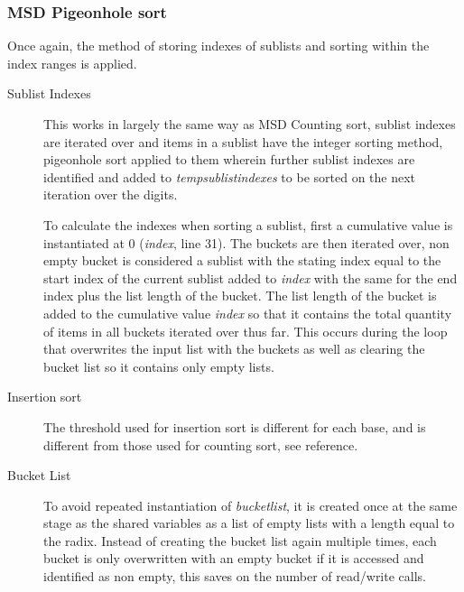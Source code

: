 \documentclass[12pt]{article}
\begin{document}
\subsubsection{MSD Pigeonhole sort}
Once again, the method of storing indexes of sublists and sorting within the index ranges is applied.
\begin{description}
	\item[Sublist Indexes] This works in largely the same way as MSD Counting sort, sublist indexes are iterated over and items in a sublist have the integer sorting method, pigeonhole sort applied to them wherein further sublist indexes are identified and added to \textit{temp\textunderscore sublist\textunderscore indexes} to be sorted on the next iteration over the digits.
	\par To calculate the indexes when sorting a sublist, first a cumulative value is instantiated at 0 (\textit{index}, line 31). The buckets are then iterated over, non empty bucket is considered a sublist with the stating index equal to the start index of the current sublist added to \textit{index} with the same for the end index plus the list length of the bucket. The list length of the bucket is added to the cumulative value \textit{index} so that it contains the total quantity of items in all buckets iterated over thus far. This occurs during the loop that overwrites the input list with the buckets as well as clearing the bucket list so it contains only empty lists.
	\item[Insertion sort] The threshold used for insertion sort is different for each base, and is different from those used for counting sort, see {\color{red} reference}.
	\item[Bucket List] To avoid repeated instantiation of \textit{bucket\textunderscore list}, it is created once at the same stage as the shared variables as a list of empty lists with a length equal to the radix. Instead of creating the bucket list again multiple times, each bucket is only overwritten with an empty bucket if it is accessed and identified as non empty, this saves on the number of read/write calls.
\end{description}
\end{document}
